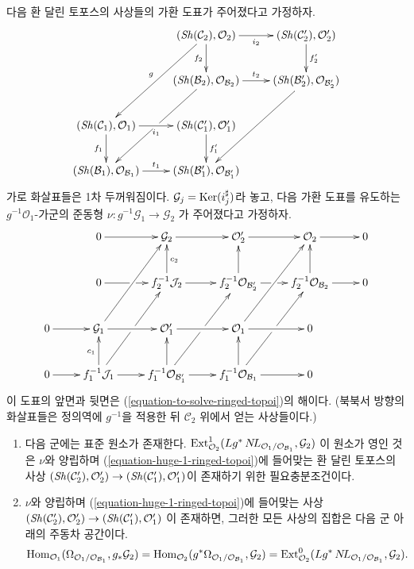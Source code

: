 \begin{lemma}
\label{lemma-huge-diagram-ringed-topoi}
다음 환 달린 토포스의 사상들의 가환 도표가 주어졌다고 가정하자.
\begin{equation}
\label{equation-huge-1-ringed-topoi}
\vcenter{
\xymatrix{
& (\Sh(\mathcal{C}_2), \mathcal{O}_2) \ar[r]_{i_2} \ar[d]_{f_2} \ar[ddl]_g &
(\Sh(\mathcal{C}'_2), \mathcal{O}'_2) \ar[d]^{f'_2} \\
&
(\Sh(\mathcal{B}_2), \mathcal{O}_{\mathcal{B}_2}) \ar[r]^{t_2} \ar[ddl]|\hole &
(\Sh(\mathcal{B}'_2), \mathcal{O}_{\mathcal{B}'_2}) \ar[ddl] \\
(\Sh(\mathcal{C}_1), \mathcal{O}_1) \ar[r]_{i_1} \ar[d]_{f_1} &
(\Sh(\mathcal{C}'_1), \mathcal{O}'_1) \ar[d]^{f'_1} \\
(\Sh(\mathcal{B}_1), \mathcal{O}_{\mathcal{B}_1}) \ar[r]^{t_1} &
(\Sh(\mathcal{B}'_1), \mathcal{O}_{\mathcal{B}'_1})
}
}
\end{equation}
가로 화살표들은 1차 두꺼워짐이다. $\mathcal{G}_j = \mathop{\mathrm{Ker}}(i_j^\sharp)$라
놓고, 다음 가환 도표를 유도하는 $g^{-1}\mathcal{O}_1$-가군의 준동형
$\nu : g^{-1}\mathcal{G}_1 \to \mathcal{G}_2$
가 주어졌다고 가정하자.
\begin{equation}
\label{equation-huge-2-ringed-topoi}
\vcenter{
\xymatrix{
& 0 \ar[r] & \mathcal{G}_2 \ar[r] &
\mathcal{O}'_2 \ar[r] &
\mathcal{O}_2 \ar[r] & 0 \\
& 0 \ar[r]|\hole &
f_2^{-1}\mathcal{J}_2 \ar[u]_{c_2} \ar[r] &
f_2^{-1}\mathcal{O}_{\mathcal{B}'_2} \ar[u] \ar[r]|\hole &
f_2^{-1}\mathcal{O}_{\mathcal{B}_2} \ar[u] \ar[r] & 0 \\
0 \ar[r] &
\mathcal{G}_1 \ar[ruu] \ar[r] &
\mathcal{O}'_1 \ar[r] &
\mathcal{O}_1 \ar[ruu] \ar[r] & 0 \\
0 \ar[r] &
f_1^{-1}\mathcal{J}_1 \ar[ruu]|\hole \ar[u]^{c_1} \ar[r] &
f_1^{-1}\mathcal{O}_{\mathcal{B}'_1} \ar[ruu]|\hole \ar[u] \ar[r] &
f_1^{-1}\mathcal{O}_{\mathcal{B}_1} \ar[ruu]|\hole \ar[u] \ar[r] & 0
}
}
\end{equation}
이 도표의 앞면과 뒷면은 (\ref{equation-to-solve-ringed-topoi})의 해이다.
(북북서 방향의 화살표들은 정의역에 $g^{-1}$을 적용한 뒤
$\mathcal{C}_2$ 위에서 얻는 사상들이다.)
\begin{enumerate}
\item 다음 군에는 표준 원소가 존재한다.
$\mathop{\mathrm{Ext}}\nolimits^1_{\mathcal{O}_2}(
Lg^*\mathop{N\!L}\nolimits_{\mathcal{O}_1/\mathcal{O}_{\mathcal{B}_1}}, \mathcal{G}_2)$
이 원소가 영인 것은 $\nu$와 양립하며
(\ref{equation-huge-1-ringed-topoi})에 들어맞는 환 달린 토포스의 사상
$(\mathop{\mathit{Sh}}\nolimits(\mathcal{C}'_2), \mathcal{O}'_2) \to
(\mathop{\mathit{Sh}}\nolimits(\mathcal{C}'_1), \mathcal{O}'_1)$이 존재하기 위한 필요충분조건이다.
\item $\nu$와 양립하며 (\ref{equation-huge-1-ringed-topoi})에 들어맞는 사상
$(\mathop{\mathit{Sh}}\nolimits(\mathcal{C}'_2), \mathcal{O}'_2) \to
(\mathop{\mathit{Sh}}\nolimits(\mathcal{C}'_1), \mathcal{O}'_1)$
이 존재하면, 그러한 모든 사상의 집합은 다음 군 아래의 주동차 공간이다.
$$
\mathop{\mathrm{Hom}}\nolimits_{\mathcal{O}_1}(
\Omega_{\mathcal{O}_1/\mathcal{O}_{\mathcal{B}_1}}, g_*\mathcal{G}_2) =
\mathop{\mathrm{Hom}}\nolimits_{\mathcal{O}_2}(
g^*\Omega_{\mathcal{O}_1/\mathcal{O}_{\mathcal{B}_1}}, \mathcal{G}_2) =
\mathop{\mathrm{Ext}}\nolimits^0_{\mathcal{O}_2}(
Lg^*\mathop{N\!L}\nolimits_{\mathcal{O}_1/\mathcal{O}_{\mathcal{B}_1}}, \mathcal{G}_2).
$$
\end{enumerate}
\end{lemma}

